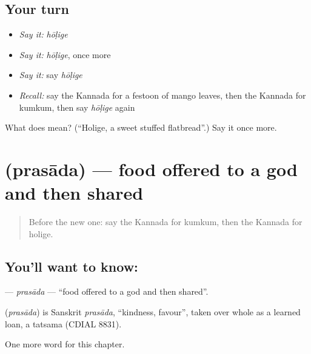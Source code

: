 \subsection*{Your turn}
\begin{itemize}
\raggedright
  \item \emph{Say it:} \emph{hōḷige}
  \item \emph{Say it:} \emph{hōḷige}, once more
  \item \emph{Say it:} say \emph{hōḷige}
  \item \emph{Recall:} say the Kannada for a festoon of mango leaves, then the Kannada for kumkum, then say \emph{hōḷige} again
\end{itemize}

\begin{tcolorbox}[breakable,colback=teal!4,colframe=teal!35!black,title={Before you move on}]
What does  mean? (\textquotedblleft{}Holige, a sweet stuffed flatbread\textquotedblright{}.) Say it once more.
\end{tcolorbox}
\section[\texorpdfstring{\kn{ಪ್ರಸಾದ} (prasāda)}{ಪ್ರಸಾದ (prasāda)}]{ (prasāda) — food offered to a god and then shared}

\label{lesson:KA-C262-prasada}



\begin{quote}
Before the new one: say the Kannada for kumkum, then the Kannada for holige.
\end{quote}

\subsection*{You'll want to know: }
\textbf{} — \emph{prasāda} — \textquotedblleft{}food offered to a god and then shared\textquotedblright{}.

\begin{cousinweb}
\textbf{} (\emph{prasāda}) is Sanskrit \emph{prasāda}, \textquotedblleft{}kindness, favour\textquotedblright{}, taken over whole as a learned loan, a tatsama (CDIAL 8831).
\end{cousinweb}

\begin{grammarlens}[title={What you've built}]
One more word for this chapter.
\end{grammarlens}

